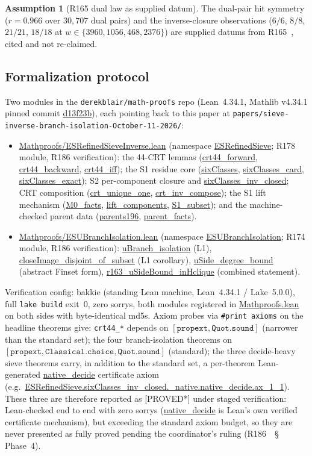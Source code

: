 \documentclass[11pt,a4paper]{article}
\theoremstyle{definition}
\newtheorem{assumption}{Assumption}
\begin{document}
\begin{assumption}[R165 dual law as supplied datum]
  \label{asm:r165}
  The dual-pair hit symmetry ($r=0.966$ over $30{,}707$ dual pairs) and
  the inverse-closure observations ($6/6$, $8/8$, $21/21$, $18/18$ at
  $w\in\{3960,1056,468,2376\}$) are supplied datums from
  R165~\cite{R165}, cited and not re-claimed.
\end{assumption}

\subsection{Formalization protocol}
\label{subsec:formalization}

Two modules in the \texttt{derekblair/math-proofs} repo (Lean~4.34.1,
Mathlib v4.34.1 pinned commit \url{d13f23b}), each pointing back to
this paper at \texttt{papers/sieve-inverse-branch-isolation-October-11-2026/}:
\begin{itemize}
\item \url{Mathproofs/ESRefinedSieveInverse.lean} (namespace
  \url{ESRefinedSieve}; R178 module, R186 verification): the 44-CRT
  lemmas (\url{crt44_forward}, \url{crt44_backward},
  \url{crt44_iff}); the S1 residue core (\url{sixClasses},
  \url{sixClasses_card}, \url{sixClasses_exact}); S2
  per-component closure and \url{sixClasses_inv_closed}; CRT
  composition (\url{crt_unique_one}, \url{crt_inv_compose});
  the S1 lift mechanism (\url{M0_facts}, \url{lift_components},
  \url{S1_subset}); and the machine-checked parent data
  (\url{parents196}, \url{parent_facts}).
\item \url{Mathproofs/ESUBranchIsolation.lean} (namespace
  \url{ESUBranchIsolation}; R174 module, R186 verification):
  \url{uBranch_isolation} (L1),
  \url{closeImage_disjoint_of_subset} (L1 corollary),
  \url{uSide_degree_bound} (abstract Finset form),
  \url{r163_uSideBound_inHclique} (combined statement).
\end{itemize}
Verification config: bakkie (standing Lean machine, Lean~4.34.1 /
Lake~5.0.0), full \texttt{lake build} exit~0, zero sorrys, both modules
registered in \url{Mathproofs.lean} on both sides with byte-identical
md5s. Axiom probes via \texttt{\#print axioms} on the headline theorems
give: \texttt{crt44\_*} depends on $[\texttt{propext},
\texttt{Quot.sound}]$ (narrower than the standard set); the four
branch-isolation theorems on
$[\texttt{propext},\texttt{Classical.choice},\texttt{Quot.sound}]$
(standard); the three decide-heavy sieve theorems carry, in addition to
the standard set, a per-theorem Lean-generated \url{native_decide}
certificate axiom (e.g.\ \url{ESRefinedSieve.sixClasses_inv_closed._native.native_decide.ax_1_1}).
These three are therefore reported as [PROVED*] under staged
verification: Lean-checked end to end with zero sorrys
(\url{native_decide} is Lean's own verified certificate mechanism),
but exceeding the standard axiom budget, so they are never presented as
fully proved pending the coordinator's ruling (R186~\cite{R186}~\S
Phase~4).
\end{document}
